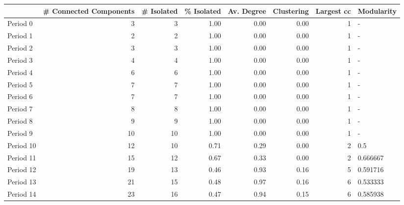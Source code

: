 \begin{tabular}{lrrrrrrl}
\toprule
{} &  \# Connected Components &  \# Isolated &  \% Isolated &  Av. Degree &  Clustering &  Largest cc & Modularity \\
\midrule
Period 0  &                       3 &           3 &        1.00 &        0.00 &        0.00 &           1 &          - \\
Period 1  &                       2 &           2 &        1.00 &        0.00 &        0.00 &           1 &          - \\
Period 2  &                       3 &           3 &        1.00 &        0.00 &        0.00 &           1 &          - \\
Period 3  &                       4 &           4 &        1.00 &        0.00 &        0.00 &           1 &          - \\
Period 4  &                       6 &           6 &        1.00 &        0.00 &        0.00 &           1 &          - \\
Period 5  &                       7 &           7 &        1.00 &        0.00 &        0.00 &           1 &          - \\
Period 6  &                       7 &           7 &        1.00 &        0.00 &        0.00 &           1 &          - \\
Period 7  &                       8 &           8 &        1.00 &        0.00 &        0.00 &           1 &          - \\
Period 8  &                       9 &           9 &        1.00 &        0.00 &        0.00 &           1 &          - \\
Period 9  &                      10 &          10 &        1.00 &        0.00 &        0.00 &           1 &          - \\
Period 10 &                      12 &          10 &        0.71 &        0.29 &        0.00 &           2 &        0.5 \\
Period 11 &                      15 &          12 &        0.67 &        0.33 &        0.00 &           2 &   0.666667 \\
Period 12 &                      19 &          13 &        0.46 &        0.93 &        0.16 &           5 &   0.591716 \\
Period 13 &                      21 &          15 &        0.48 &        0.97 &        0.16 &           6 &   0.533333 \\
Period 14 &                      23 &          16 &        0.47 &        0.94 &        0.15 &           6 &   0.585938 \\

\end{tabular}
